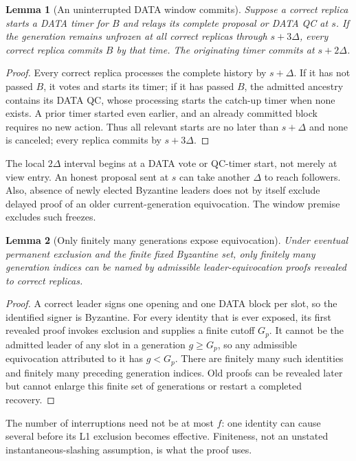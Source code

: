 \documentclass[11pt,a4paper]{article}
\newtheorem{lemma}[lemma]{Lemma}
\begin{document}
\begin{lemma}[An uninterrupted DATA window commits]
\label{lem:window}
Suppose a correct replica starts a DATA timer for $B$ and relays its
complete proposal or DATA QC at $s$. If the generation remains unfrozen
at all correct replicas through $s+3\Delta$, every correct replica
commits $B$ by that time. The originating timer commits at $s+2\Delta$.
\end{lemma}
\begin{proof}
Every correct replica processes the complete history by $s+\Delta$.
If it has not passed $B$, it votes and starts its timer; if it has passed
$B$, the admitted ancestry contains its DATA QC, whose processing starts
the catch-up timer when none exists. A prior timer started even earlier,
and an already committed block requires no new action.
Thus all relevant starts are no later than $s+\Delta$ and none is
canceled; every replica commits by $s+3\Delta$.
\end{proof}
The local $2\Delta$ interval begins at a DATA vote or QC-timer start,
not merely at view entry. An honest proposal sent at $s$ can take another
$\Delta$ to reach followers. Also, absence of newly elected Byzantine
leaders does not by itself exclude delayed proof of an older
current-generation equivocation. The window premise excludes such freezes.

\begin{lemma}[Only finitely many generations expose equivocation]
\label{lem:finite}
Under eventual permanent exclusion and the finite fixed Byzantine set,
only finitely many generation indices can be named by admissible
leader-equivocation proofs revealed to correct replicas.
\end{lemma}
\begin{proof}
A correct leader signs one opening and one DATA block per slot, so the
identified signer is Byzantine. For every identity that is ever exposed,
its first revealed proof invokes exclusion and supplies a finite cutoff
$G_p$. It cannot be the admitted leader of any slot in a generation
$g\ge G_p$, so any admissible equivocation attributed to it has $g<G_p$.
There are finitely many such identities and finitely many preceding
generation indices. Old proofs can be revealed later but cannot enlarge
this finite set of generations or restart a completed recovery.
\end{proof}
The number of interruptions need not be at most $f$: one identity can
cause several before its L1 exclusion becomes effective. Finiteness,
not an unstated instantaneous-slashing assumption, is what the proof uses.
\end{document}
